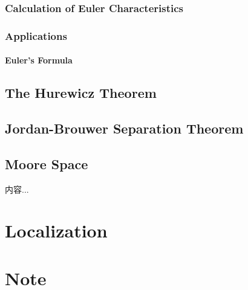 \documentclass[Total.tex]{subfiles}
\begin{document}
			\subsection{Calculation of Euler Characteristics}
			\subsection{Applications}
				\subsubsection{Euler's Formula}
		\section{The Hurewicz Theorem}
		\section{Jordan-Brouwer Separation Theorem}
		\section{Moore Space}
			\begin{Def}
				内容...
			\end{Def}
	\chapter{Localization}
	\chapter{Note}
\end{document}
